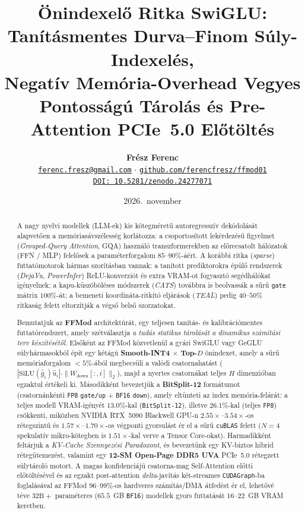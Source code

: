 \documentclass[10pt,twocolumn]{article}
\title{\Large\bfseries Önindexelő Ritka SwiGLU: Tanításmentes Durva--Finom Súly-Indexelés,\\Negatív Memória-Overhead Vegyes Pontosságú Tárolás és Pre-Attention PCIe~5.0 Előtöltés}
\author{
  \textbf{Frész Ferenc}\\
  \href{mailto:ferenc.fresz@gmail.com}{\texttt{ferenc.fresz@gmail.com}} $\cdot$ \href{https://github.com/ferencfresz/ffmod01}{\texttt{github.com/ferencfresz/ffmod01}}\\
  \href{https://doi.org/10.5281/zenodo.24277071}{\texttt{DOI: 10.5281/zenodo.24277071}}
}
\date{2026.\ november}
\begin{document}
\maketitle

\begin{abstract}
A nagy nyelvi modellek (LLM-ek) kis kötegméretű autoregresszív dekódolását alapvetően a memóriasávszélesség korlátozza: a csoportosított lekérdezésű figyelmet (\emph{Grouped-Query Attention}, GQA) használó transzformerekben az előrecsatolt hálózatok (FFN / MLP) felelősek a paraméterforgalom $85\text{--}90\%$-áért. A korábbi ritka (\emph{sparse}) futtatómotorok hármas szorításban vannak: a tanított prediktorokra épülő rendszerek (\emph{DejaVu}, \emph{PowerInfer}) ReLU-konverziót és extra VRAM-ot fogyasztó segédhálókat igényelnek; a kapu-küszöböléses módszerek (\emph{CATS}) továbbra is beolvassák a sűrű \texttt{gate} mátrix $100\%$-át; a bemeneti koordináta-ritkító eljárások (\emph{TEAL}) pedig $40\text{--}50\%$ ritkaság felett eltorzítják a végső belső szorzatokat.

Bemutatjuk az \textbf{FFMod} architektúrát, egy teljesen tanítás- és kalibrációmentes futtatórendszert, amely szétválasztja \emph{a tudás statikus tárolását} \emph{a dinamikus számítási terv készítésétől}. Elsőként az FFMod közvetlenül a gyári SwiGLU vagy GeGLU súlyhármasokból épít egy kétágú \textbf{Smooth-INT4 $\times$ Top-$D$} önindexet, amely a sűrű memóriaforgalom $<5\%$-ából megbecsüli a valódi csatornahatást ($|\mathrm{SiLU}(\hat{g}_i)\hat{u}_i|\cdot\|W_{\mathrm{down}}[:,i]\|_2$), majd a nyertes csatornákat teljes $H$ dimenzióban egzaktul értékeli ki. Másodikként bevezetjük a \textbf{BitSplit-12} formátumot (csatornánkénti \texttt{FP8} \texttt{gate/up} + \texttt{BF16} \texttt{down}), amely eltünteti az index memória-felárát: a teljes modell VRAM-igényét $13.0\%$-kal (\texttt{BitSplit-12}), illetve $26.1\%$-kal (teljes \texttt{FP8}) csökkenti, miközben NVIDIA RTX~5090 Blackwell GPU-n $2.55\times\text{--}3.54\times$-os rétegszintű és $1.57\times\text{--}1.70\times$-os végponti gyorsulást ér el a sűrű \texttt{cuBLAS} felett ($N=4$ spekulatív mikro-kötegben is $1.51\times$-kal verve a Tensor Core-okat). Harmadikként feltárjuk a \emph{KV-Cache Szennyezési Paradoxont}, és bevezetünk egy KV-biztos hibrid rétegütemezést, valamint egy \textbf{12-SM Open-Page DDR5 UVA} PCIe~5.0 rétegzett súlytároló motort. A magas konfidenciájú csatorna-mag Self-Attention előtti előtöltésével és az egzakt post-attention \emph{delta}-javítás két-streames \texttt{CUDAGraph}-ba foglalásával az FFMod $96\text{--}99\%$-os hardveres számítás/DMA átfedést ér el, lehetővé téve $32\text{B}+$ paraméteres ($65.5$~GB \texttt{BF16}) modellek gyors futtatását $16\text{--}22$~GB VRAM keretben.
\end{abstract}
\end{document}

